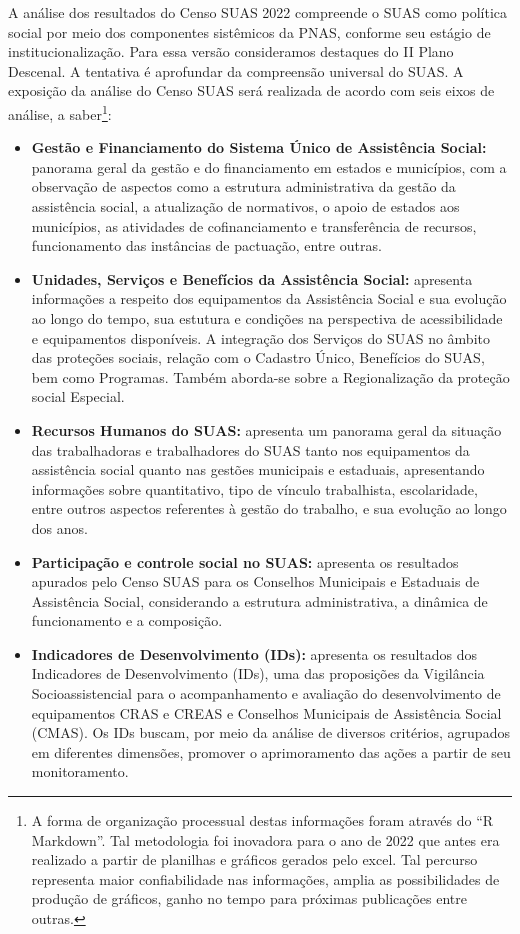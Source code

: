 \documentclass[
  brazilian]{report}
\begin{document}
A análise dos resultados do Censo SUAS 2022 compreende o SUAS como
política social por meio dos componentes sistêmicos da PNAS, conforme
seu estágio de institucionalização. Para essa versão consideramos
destaques do II Plano Descenal. A tentativa é aprofundar da compreensão
universal do SUAS. A exposição da análise do Censo SUAS será realizada
de acordo com seis eixos de análise, a
saber\footnote{A forma de organização processual destas informações foram através do “R Markdown”. Tal metodologia foi inovadora para o ano de 2022 que antes era realizado a partir de planilhas e gráficos gerados pelo excel. Tal percurso representa maior confiabilidade nas informações, amplia as possibilidades de produção de gráficos, ganho no tempo para próximas publicações entre outras.}:

\begin{itemize}
\item
  \textbf{Gestão e Financiamento do Sistema Único de Assistência
  Social:} panorama geral da gestão e do financiamento em estados e
  municípios, com a observação de aspectos como a estrutura
  administrativa da gestão da assistência social, a atualização de
  normativos, o apoio de estados aos municípios, as atividades de
  cofinanciamento e transferência de recursos, funcionamento das
  instâncias de pactuação, entre outras.
\item
  \textbf{Unidades, Serviços e Benefícios da Assistência Social:}
  apresenta informações a respeito dos equipamentos da Assistência
  Social e sua evolução ao longo do tempo, sua estutura e condições na
  perspectiva de acessibilidade e equipamentos disponíveis. A integração
  dos Serviços do SUAS no âmbito das proteções sociais, relação com o
  Cadastro Único, Benefícios do SUAS, bem como Programas. Também
  aborda-se sobre a Regionalização da proteção social Especial.
\item
  \textbf{Recursos Humanos do SUAS:} apresenta um panorama geral da
  situação das trabalhadoras e trabalhadores do SUAS tanto nos
  equipamentos da assistência social quanto nas gestões municipais e
  estaduais, apresentando informações sobre quantitativo, tipo de
  vínculo trabalhista, escolaridade, entre outros aspectos referentes à
  gestão do trabalho, e sua evolução ao longo dos anos.
\item
  \textbf{Participação e controle social no SUAS:} apresenta os
  resultados apurados pelo Censo SUAS para os Conselhos Municipais e
  Estaduais de Assistência Social, considerando a estrutura
  administrativa, a dinâmica de funcionamento e a composição.
\item
  \textbf{Indicadores de Desenvolvimento (IDs):} apresenta os resultados
  dos Indicadores de Desenvolvimento (IDs), uma das proposições da
  Vigilância Socioassistencial para o acompanhamento e avaliação do
  desenvolvimento de equipamentos CRAS e CREAS e Conselhos Municipais de
  Assistência Social (CMAS). Os IDs buscam, por meio da análise de
  diversos critérios, agrupados em diferentes dimensões, promover o
  aprimoramento das ações a partir de seu monitoramento.
\end{itemize}
\end{document}
